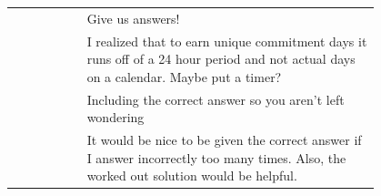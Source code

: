 \begin{longtable}{r|p{0.8\linewidth}}
		& Give us answers!                                                                                                                                                                                                                                                                                                                                                                                                                                                                                                                                                                                                                                                                                                                                 \\
		& I realized that to earn unique commitment days it runs off of a 24 hour period and not actual days on a calendar. Maybe put a timer?                                                                                                                                                                                                                                                                                                                                                                                                                                                                                                                                                                                                             \\
		& Including the correct answer so you aren't left wondering                                                                                                                                                                                                                                                                                                                                                                                                                                                                                                                                                                                                                                                                                        \\
		& It would be nice to be given the correct answer if I answer incorrectly too many times. Also, the worked out solution would be helpful.                                                                                                                                                                                                                                                                                                                                                                                                                                                                                                                                                                                                          \\

\end{longtable}
